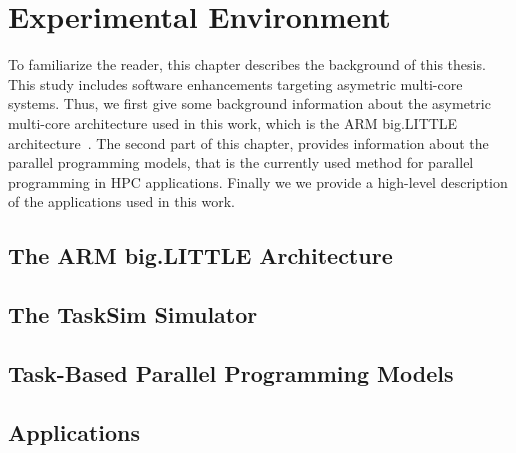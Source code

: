 \chapter{Experimental Environment}
\label{chapter.background} 
To familiarize the reader, this chapter describes the background of this thesis. 
This study includes software enhancements targeting asymetric multi-core systems.
Thus, we first give some background information about the asymetric multi-core architecture used in this work, which is the ARM big.LITTLE architecture~\cite{Greenhalgh2011}.
The second part of this chapter, provides information about the parallel programming models, that is the currently used method for parallel programming in HPC applications.
Finally we we provide a high-level description of the applications used in this work.
\newpage
\section{The ARM big.LITTLE Architecture}
\label{sec.background.arm}


\section{The TaskSim Simulator}
\label{sec.background.simulation}


\section{Task-Based Parallel Programming Models}
\label{sec.background.taskbased}


\section{Applications}
\label{sec.background.applications}

